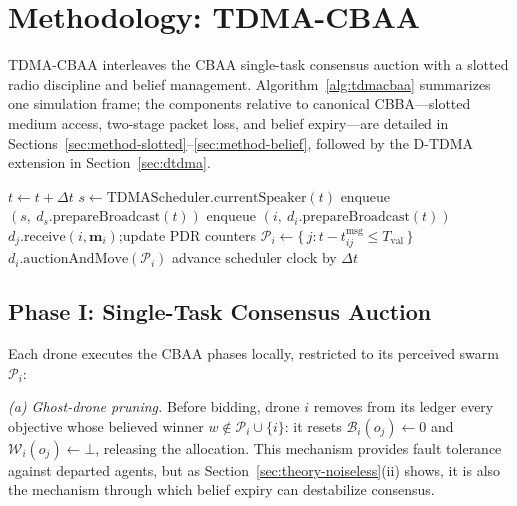 \section{Methodology: TDMA-CBAA}\label{sec:methodology}

TDMA-CBAA interleaves the CBAA single-task consensus auction with a slotted radio discipline and belief management.
Algorithm~\ref{alg:tdmacbaa} summarizes one simulation frame; the components relative to canonical CBBA---slotted medium access, two-stage packet loss, and belief expiry---are detailed in Sections~\ref{sec:method-slotted}--\ref{sec:method-belief}, followed by the D-TDMA extension in Section~\ref{sec:dtdma}.

\begin{algorithm}[t]
\caption{TDMA-CBAA frame execution (one tick, $\Delta t$)}
\label{alg:tdmacbaa}
\begin{algorithmic}[1]
\State $t \gets t + \Delta t$
\Statex {}
    \State $s \gets \mathrm{TDMAScheduler}.\mathrm{currentSpeaker}(t)$
        \State enqueue $(s,\ d_s.\mathrm{prepareBroadcast}(t))$
    \EndIf
\Else
        \State enqueue $(i,\ d_i.\mathrm{prepareBroadcast}(t))$
    \EndFor
\EndIf
\Statex {}
        \State $d_j.\mathrm{receive}(i, \mathbf{m}_i)$;\quad update PDR counters
    \EndIf
\EndFor
\Statex {}
    \State $\mathcal{P}_i \gets \{\, j : t - t^{\mathrm{msg}}_{ij} \leq T_{\mathrm{val}} \,\}$ 
    \State $d_i.\mathrm{auctionAndMove}(\mathcal{P}_i)$
\EndFor
\State advance scheduler clock by $\Delta t$
\end{algorithmic}
\end{algorithm}

\subsection{Phase I: Single-Task Consensus Auction}\label{sec:method-auction}
Each drone executes the CBAA phases locally, restricted to its perceived swarm $\mathcal{P}_i$:

\emph{(a) Ghost-drone pruning.}
Before bidding, drone $i$ removes from its ledger every objective whose believed winner $w \notin \mathcal{P}_i \cup \{i\}$: it resets $\mathcal{B}_i(o_j) \leftarrow 0$ and $\mathcal{W}_i(o_j) \leftarrow \bot$, releasing the allocation.
This mechanism provides fault tolerance against departed agents, but as Section~\ref{sec:theory-noiseless}(ii) shows, it is also the mechanism through which belief expiry can destabilize consensus.

